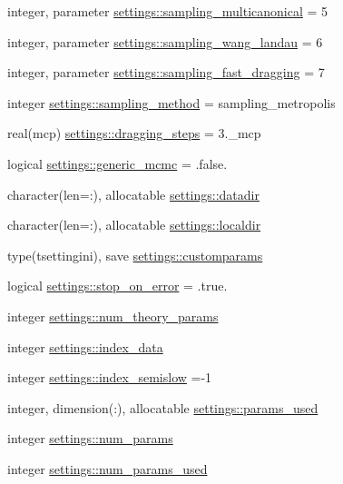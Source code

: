 \begin{DoxyCompactItemize}
integer, parameter \mbox{\hyperlink{namespacesettings_ab692e79a9d756d1ebf42dba033da3c9b}{settings\+::sampling\+\_\+multicanonical}} = 5
\item 
integer, parameter \mbox{\hyperlink{namespacesettings_a88e45b9a2ab5447d2cb82b74672906de}{settings\+::sampling\+\_\+wang\+\_\+landau}} = 6
\item 
integer, parameter \mbox{\hyperlink{namespacesettings_a9cd020650f7e83b9fda45b3bfdda34bf}{settings\+::sampling\+\_\+fast\+\_\+dragging}} = 7
\item 
integer \mbox{\hyperlink{namespacesettings_a01e6691ce72977baf15dd20434012f65}{settings\+::sampling\+\_\+method}} = sampling\+\_\+metropolis
\item 
real(mcp) \mbox{\hyperlink{namespacesettings_ab8364bc8c9e772b73f258e33676806ec}{settings\+::dragging\+\_\+steps}} = 3.\+\_\+mcp
\item 
logical \mbox{\hyperlink{namespacesettings_af46cd3e56cf132b962ba2a208f29b04f}{settings\+::generic\+\_\+mcmc}} = .false.
\item 
character(len=\+:), allocatable \mbox{\hyperlink{namespacesettings_a2deacc581b6841445fd044dab25ef389}{settings\+::datadir}}
\item 
character(len=\+:), allocatable \mbox{\hyperlink{namespacesettings_a464bacc2f6a7b48655e92110d990d457}{settings\+::localdir}}
\item 
type(tsettingini), save \mbox{\hyperlink{namespacesettings_a7f5934d4eca8e396a1c744c7fa88bcba}{settings\+::customparams}}
\item 
logical \mbox{\hyperlink{namespacesettings_a4acafe693ea8cedb2044a2ce90c9469f}{settings\+::stop\+\_\+on\+\_\+error}} = .true.
\item 
integer \mbox{\hyperlink{namespacesettings_a362078e6b11a6c4f0eff6aee65cf046a}{settings\+::num\+\_\+theory\+\_\+params}}
\item 
integer \mbox{\hyperlink{namespacesettings_a80a8fe2bea1b08d8109b2cfcb09cb02c}{settings\+::index\+\_\+data}}
\item 
integer \mbox{\hyperlink{namespacesettings_a56f153f87bcbfcf9717c0efc77c20fb8}{settings\+::index\+\_\+semislow}} =-\/1
\item 
integer, dimension(\+:), allocatable \mbox{\hyperlink{namespacesettings_a2d59bb48a1012143991ce9093fc76be5}{settings\+::params\+\_\+used}}
\item 
integer \mbox{\hyperlink{namespacesettings_a4faf08502e49a2f851b29d8f7d5fb71d}{settings\+::num\+\_\+params}}
\item 
integer \mbox{\hyperlink{namespacesettings_ace1e5374df8682e0f85b1b7bcc21451c}{settings\+::num\+\_\+params\+\_\+used}}

\end{DoxyCompactItemize}
